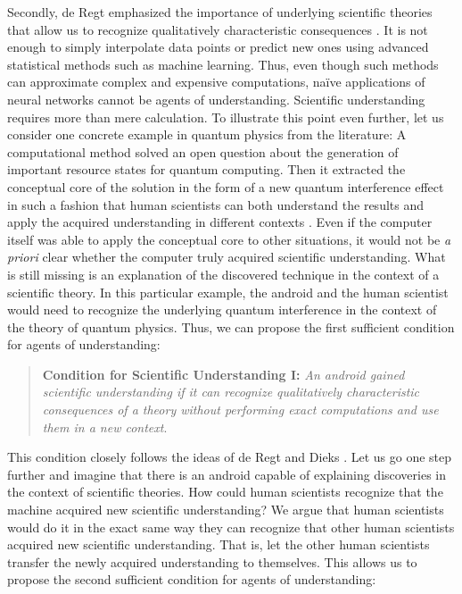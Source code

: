Secondly, de Regt emphasized the importance of underlying scientific theories that allow us to recognize qualitatively characteristic consequences \cite{de2017understanding}. It is not enough to simply interpolate data points or predict new ones using advanced statistical methods such as machine learning. Thus, even though such methods can approximate complex and expensive computations, na\"ive applications of neural networks cannot be agents of understanding. Scientific understanding requires more than mere calculation. To illustrate this point even further, let us consider one concrete example in quantum physics from the literature: A computational method solved an open question about the generation of important resource states for quantum computing. Then it extracted the conceptual core of the solution in the form of a new quantum interference effect in such a fashion that human scientists can both understand the results and apply the acquired understanding in different contexts \cite{krenn2020conceptual}. Even if the computer itself was able to apply the conceptual core to other situations, it would not be \textit{a priori} clear whether the computer truly acquired scientific understanding. What is still missing is an explanation of the discovered technique in the context of a scientific theory. In this particular example, the android and the human scientist would need to recognize the underlying quantum interference in the context of the theory of quantum physics. Thus, we can propose the first sufficient condition for agents of understanding:


\begin{quote}
\textbf{Condition for Scientific Understanding I:}
\textit{An android gained scientific understanding if it can recognize qualitatively characteristic consequences of a theory without performing exact computations and use them in a new context}.
\end{quote}



This condition closely follows the ideas of de Regt and Dieks \cite{de2005contextual}. Let us go one step further and imagine that there is an android capable of explaining discoveries in the context of scientific theories. How could human scientists recognize that the machine acquired new scientific understanding? We argue that human scientists would do it in the exact same way they can recognize that other human scientists acquired new scientific understanding. That is, let the other human scientists transfer the newly acquired understanding to themselves. This allows us to propose the second sufficient condition for agents of understanding:


